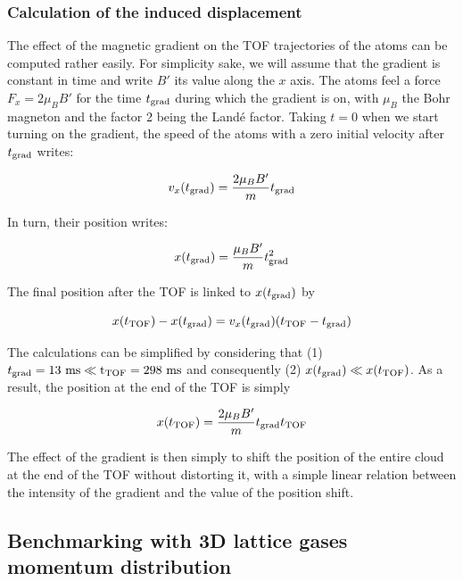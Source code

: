 \subsubsection{Calculation of the induced displacement}

The effect of the magnetic gradient on the TOF trajectories of the atoms can be computed rather easily. For simplicity sake, we will assume that the gradient is constant in time and write $B'$ its value along the $x$ axis. The atoms feel a force $F_x=2 \mu_B B'$ for the time $t_{\rm{grad}}$ during which the gradient is on, with $\mu_B$ the Bohr magneton and the factor 2 being the Landé factor. Taking $t=0$ when we start turning on the gradient, the speed of the atoms with a zero initial velocity after $t_{\rm{grad}}$ writes:

\begin{equation}
    v_x(t_{\rm{grad}}) = \frac{2 \mu_B B'}{m} t_{\rm{grad}}
\end{equation}

\noindent In turn, their position writes:

\begin{equation}
    x(t_{\rm{grad}}) = \frac{\mu_B B'}{m} t_{\rm{grad}}^2
\end{equation}

\noindent The final position after the TOF is linked to $x(t_{\rm{grad}})$ by

\begin{equation}
    x(t_{\rm{TOF}})-x(t_{\rm{grad}}) = v_x(t_{\rm{grad}}) (t_{\rm{TOF}}- t_{\rm{grad}})
\end{equation}

The calculations can be simplified by considering that (1) $t_{\rm{grad}} = 13 \ \rm{ms} \ll t_{\rm{TOF}} = 298 \ \rm{ms}$ and consequently (2) $x(t_{\rm{grad}}) \ll x(t_{\rm{TOF}})$. As a result, the position at the end of the TOF is simply

\begin{equation}
    x(t_{\rm{TOF}})= \frac{2 \mu_B B'}{m} t_{\rm{grad}} t_{\rm{TOF}}
\end{equation}

The effect of the gradient is then simply to shift the position of the entire cloud at the end of the TOF without distorting it, with a simple linear relation between the intensity of the gradient and the value of the position shift.

\subsection{Benchmarking with 3D lattice gases momentum distribution}

